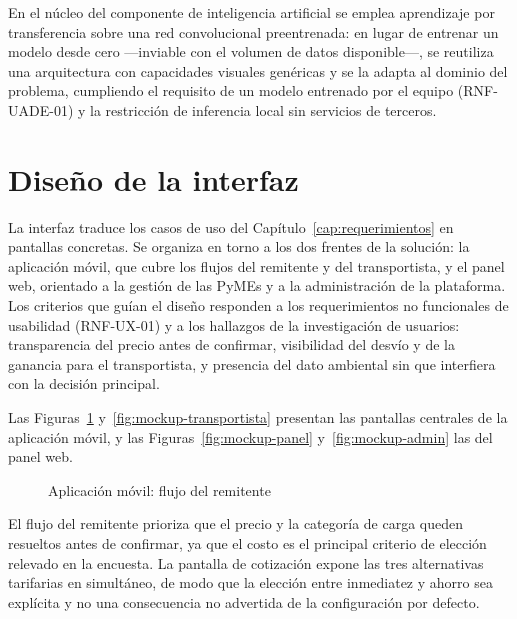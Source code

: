 {En el núcleo del componente de inteligencia artificial se emplea aprendizaje por transferencia sobre una red convolucional preentrenada: en lugar de entrenar un modelo desde cero —inviable con el volumen de datos disponible—, se reutiliza una arquitectura con capacidades visuales genéricas y se la adapta al dominio del problema, cumpliendo el requisito de un modelo entrenado por el equipo (RNF-UADE-01) y la restricción de inferencia local sin servicios de terceros.

\section{Diseño de la interfaz}

La interfaz traduce los casos de uso del Capítulo~\ref{cap:requerimientos} en pantallas concretas. Se organiza en torno a los dos frentes de la solución: la aplicación móvil, que cubre los flujos del remitente y del transportista, y el panel web, orientado a la gestión de las PyMEs y a la administración de la plataforma. Los criterios que guían el diseño responden a los requerimientos no funcionales de usabilidad (RNF-UX-01) y a los hallazgos de la investigación de usuarios: transparencia del precio antes de confirmar, visibilidad del desvío y de la ganancia para el transportista, y presencia del dato ambiental sin que interfiera con la decisión principal.

Las Figuras~\ref{fig:mockup-remitente} y~\ref{fig:mockup-transportista} presentan las pantallas centrales de la aplicación móvil, y las Figuras~\ref{fig:mockup-panel} y~\ref{fig:mockup-admin} las del panel web.

\begin{figure}[H]
    \centering\color{nuevo}
    \hfill
    \hfill
    \caption{Aplicación móvil: flujo del remitente}
    \label{fig:mockup-remitente}
\end{figure}

El flujo del remitente prioriza que el precio y la categoría de carga queden resueltos antes de confirmar, ya que el costo es el principal criterio de elección relevado en la encuesta. La pantalla de cotización expone las tres alternativas tarifarias en simultáneo, de modo que la elección entre inmediatez y ahorro sea explícita y no una consecuencia no advertida de la configuración por defecto.

}
